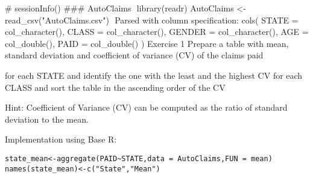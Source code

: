 \documentclass[a4paper,12pt]{article}
\begin{document}
\large
# sessionInfo()
### AutoClaims
​
library(readr)
AutoClaims <- read_csv("AutoClaims.csv")
​
Parsed with column specification:
cols(
  STATE = col_character(),
  CLASS = col_character(),
  GENDER = col_character(),
  AGE = col_double(),
  PAID = col_double()
)
\newpage
Exercise 1
Prepare a table with mean, standard deviation and coefficient of variance (CV) of the claims paid

for each STATE and identify the one with the least and the highest CV
for each CLASS and sort the table in the ascending order of the CV

Hint: Coefficient of Variance (CV) can be computed as the ratio of standard deviation to the mean.

\medskip 
Implementation using Base R:
\begin{verbatim}
state_mean<-aggregate(PAID~STATE,data = AutoClaims,FUN = mean)
names(state_mean)<-c("State","Mean")
\end{verbatim}
\end{document}
